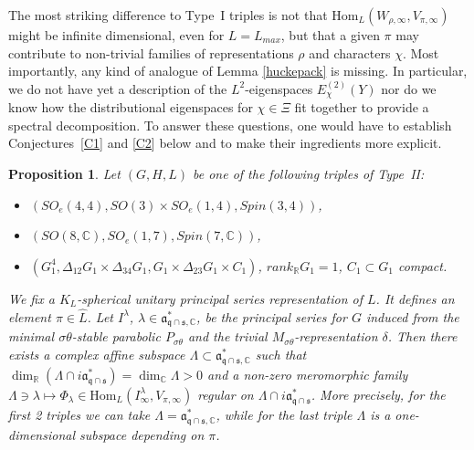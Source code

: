 \documentclass[10]{amsart}
\newtheorem{pro}[thm]{Proposition}
\theoremstyle{remark}
\theoremstyle{definition}
\numberwithin{equation}{section}
\newcommand{\R}{\mathbb{R}}           %
\newcommand{\C}{\mathbb{C}}           %
\newcommand{\Hom}{\mathrm{Hom}}
\newcommand{\fa}{{\mathfrak a}}             %
\newcommand{\fq}{{\mathfrak q}}
\newcommand{\fs}{{\mathfrak s}}
\begin{document}
{The most striking difference to Type~I triples is not that $\Hom_L(W_{\rho,\infty},V_{\pi,\infty})$ might be infinite dimensional, even for $L=L_{max}$, but that a given $\pi$ may
contribute to non-trivial families of representations $\rho$ and characters $\chi$. 
Most importantly, any kind of analogue of Lemma \ref{huckepack} is missing. In particular, we do not have yet a description of the $L^2$-eigenspaces $E_\chi^{(2)}(Y)$ nor
do we know how the distributional eigenspaces for $\chi\in\Xi$ fit together to provide a spectral decomposition. To answer these questions, one would have to establish Conjectures~\ref{C1} and \ref{C2} below and to make their ingredients more explicit. 


\begin{pro}\label{knarz}
Let $(G,H,L)$ be one of the following triples of Type~II:
\begin{itemize}
\item $(SO_e(4,4),SO(3)\times SO_e(1,4), Spin(3,4))$,
\item $(SO(8,\C),SO_e(1,7),Spin(7,\C))$,
\item $(G_1^4,\Delta_{12}G_1\times\Delta_{34}G_1,G_1\times \Delta_{23}G_1\times C_1)$, $rank_\R G_1=1$, $C_1\subset G_1$ compact.
\end{itemize}
We fix a $K_L$-spherical unitary principal series representation of $L$. It defines an element $\pi\in \widehat L$. Let $I^\lambda$, $\lambda\in\fa_{\fq\cap\fs,\C}^*$, be the principal series for $G$ induced from
the minimal $\sigma\theta$-stable parabolic $P_{\sigma\theta}$ and the trivial $M_{\sigma\theta}$-representation $\delta$. Then there exists a complex affine subspace
$\Lambda\subset \fa_{\fq\cap\fs,\C}^*$ such that $\dim_\R(\Lambda\cap i\fa_{\fq\cap\fs}^*)=\dim_\C\Lambda>0$ and  a non-zero meromorphic family
$\Lambda\ni\lambda\mapsto \Phi_\lambda\in \Hom_L(I^\lambda_\infty, V_{\pi,\infty})$ regular on $\Lambda\cap i\fa_{\fq\cap\fs}^*$. More precisely, for the first 2 triples we can take $\Lambda=\fa_{\fq\cap\fs,\C}^*$,
while for the last triple $\Lambda$ is a one-dimensional subspace depending on $\pi$.
\end{pro}


}
\end{document}
